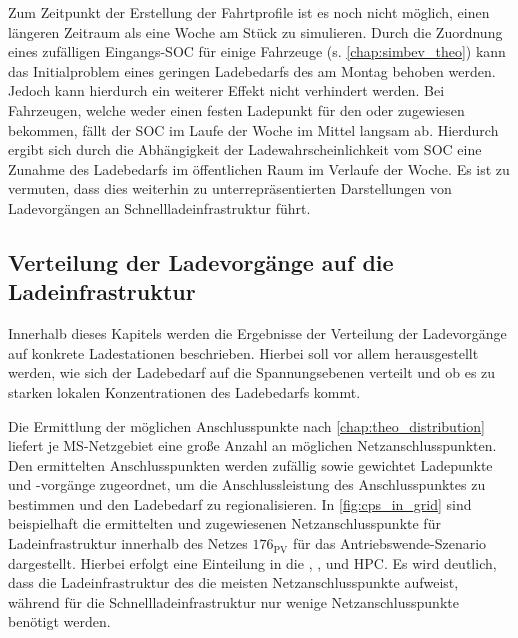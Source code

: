 

Zum Zeitpunkt der Erstellung der Fahrtprofile ist es noch nicht möglich, einen längeren Zeitraum als eine Woche am Stück zu simulieren.
Durch die Zuordnung eines zufälligen Eingangs-\gls{SOC} für einige Fahrzeuge (s. \autoref{chap:simbev_theo}) kann das Initialproblem eines geringen Ladebedarfs des \UC \Firmeparkplatz am Montag behoben werden.
Jedoch kann hierdurch ein weiterer Effekt nicht verhindert werden.
Bei Fahrzeugen, welche weder einen festen Ladepunkt für den \UC \zH oder \Firmeparkplatz zugewiesen bekommen, fällt der \gls{SOC} im Laufe der Woche im Mittel langsam ab.
Hierdurch ergibt sich durch die Abhängigkeit der Ladewahrscheinlichkeit vom \gls{SOC} eine Zunahme des Ladebedarfs im öffentlichen Raum im Verlaufe der Woche.
Es ist zu vermuten, dass dies weiterhin zu un­ter­re­prä­sen­tierten Darstellungen von Ladevorgängen an Schnellladeinfrastruktur führt.


\subsection{Verteilung der Ladevorgänge auf die Ladeinfrastruktur}\label{chap:distribute_demand_ev}

Innerhalb dieses Kapitels werden die Ergebnisse der Verteilung der Ladevorgänge auf konkrete Ladestationen beschrieben.
Hierbei soll vor allem herausgestellt werden, wie sich der Ladebedarf auf die Spannungsebenen verteilt und ob es zu starken lokalen Konzentrationen des Ladebedarfs kommt.\medskip

Die Ermittlung der möglichen Anschlusspunkte nach \autoref{chap:theo_distribution} liefert je \gls{MS}-Netzgebiet eine große Anzahl an möglichen Netzanschlusspunkten.
Den ermittelten Anschlusspunkten werden zufällig sowie gewichtet Ladepunkte und -vorgänge zugeordnet, um die Anschlussleistung des Anschlusspunktes zu bestimmen und den Ladebedarf zu regionalisieren.
In \autoref{fig:cps_in_grid} sind beispielhaft die ermittelten und zugewiesenen Netzanschlusspunkte für Ladeinfrastruktur innerhalb des Netzes \(176_{\text{PV}}\) für das Antriebswende-Szenario dargestellt.
Hierbei erfolgt eine Einteilung in die \UCs \zHdot, \Firmeparkplatzdot, \oeffen und \gls{HPC}.
Es wird deutlich, dass die Ladeinfrastruktur des \UC \zH die meisten Netzanschlusspunkte aufweist, während für die Schnellladeinfrastruktur nur wenige Netzanschlusspunkte benötigt werden.



